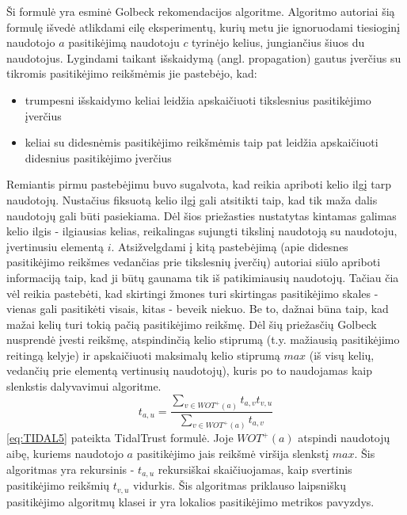 \documentclass{VUMIFInfMagistrinis}
\begin{document}
Ši formulė yra esminė Golbeck rekomendacijos algoritme. Algoritmo autoriai šią formulę išvedė atlikdami eilę eksperimentų, kurių metu jie ignoruodami tiesioginį naudotojo $a$ pasitikėjimą naudotoju $c$ tyrinėjo kelius, jungiančius šiuos du naudotojus. Lygindami taikant išskaidymą (angl. propagation) gautus įverčius su tikromis pasitikėjimo reikšmėmis jie pastebėjo, kad: 
\begin{itemize}
	\item trumpesni išskaidymo keliai leidžia apskaičiuoti tikslesnius pasitikėjimo įverčius
	\item keliai su didesnėmis pasitikėjimo reikšmėmis taip pat leidžia apskaičiuoti didesnius pasitikėjimo įverčius
\end{itemize}
Remiantis pirmu pastebėjimu buvo sugalvota, kad reikia apriboti kelio ilgį tarp naudotojų. Nustačius fiksuotą kelio ilgį gali atsitikti taip, kad tik maža dalis naudotojų gali būti pasiekiama. Dėl šios priežasties nustatytas kintamas galimas kelio ilgis - ilgiausias kelias, reikalingas sujungti tikslinį naudotoją su naudotoju, įvertinusiu elementą $i$.
\newline
\indent
Atsižvelgdami į kitą pastebėjimą (apie didesnes pasitikėjimo reikšmes vedančias prie tikslesnių įverčių) autoriai siūlo apriboti informaciją taip, kad ji būtų gaunama tik iš patikimiausių naudotojų. Tačiau čia vėl reikia pastebėti, kad skirtingi žmones turi skirtingas pasitikėjimo skales - vienas gali pasitikėti visais, kitas - beveik niekuo. Be to, dažnai būna taip, kad mažai kelių turi tokią pačią pasitikėjimo reikšmę. Dėl šių priežasčių Golbeck nusprendė įvesti reikšmę, atspindinčią kelio stiprumą (t.y. mažiausią pasitikėjimo reitingą kelyje) ir apskaičiuoti maksimalų kelio stiprumą $max$ (iš visų kelių, vedančių prie elementą vertinusių naudotojų), kuris po to naudojamas kaip slenkstis dalyvavimui algoritme.
\begin{equation}\label{eq:TIDAL5}
t_{a,u} = \frac{\sum\limits_{v \in WOT^{+}(a)}t_{a,v}t_{v,u}}{\sum\limits_{v \in WOT^{+}(a)}t_{a,v}}
\end{equation}
\eqref{eq:TIDAL5} pateikta TidalTrust formulė. Joje $WOT^{+}(a)$ atspindi naudotojų aibę, kuriems naudotojo $a$ pasitikėjimo jais reikšmė viršija slenkstį $max$.
\newline
\indent
Šis algoritmas yra rekursinis - $t_{a,u}$ rekursiškai skaičiuojamas, kaip svertinis pasitikėjimo reikšmių $t_{v,u}$ vidurkis. Šis algoritmas priklauso laipsniškų pasitikėjimo algoritmų klasei ir yra lokalios pasitikėjimo metrikos pavyzdys.
\end{document}
